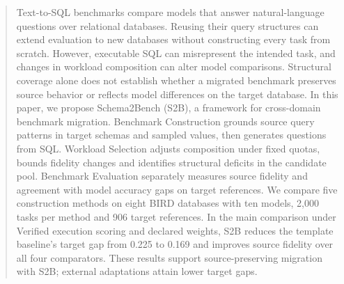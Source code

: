\begin{abstract}
Text-to-SQL benchmarks compare models that answer natural-language questions over relational databases. Reusing their query structures can extend evaluation to new databases without constructing every task from scratch.
However, executable SQL can misrepresent the intended task, and changes in workload composition can alter model comparisons. Structural coverage alone does not establish whether a migrated benchmark preserves source behavior or reflects model differences on the target database.
In this paper, we propose Schema2Bench (S2B), a framework for cross-domain benchmark migration. Benchmark Construction grounds source query patterns in target schemas and sampled values, then generates questions from SQL. Workload Selection adjusts composition under fixed quotas, bounds fidelity changes and identifies structural deficits in the candidate pool. Benchmark Evaluation separately measures source fidelity and agreement with model accuracy gaps on target references.
We compare five construction methods on eight BIRD databases with ten models, 2,000 tasks per method and 906 target references. In the main comparison under Verified execution scoring and declared weights, S2B reduces the template baseline's target gap from 0.225 to 0.169 and improves source fidelity over all four comparators. These results support source-preserving migration with S2B; external adaptations attain lower target gaps.
\end{abstract}
